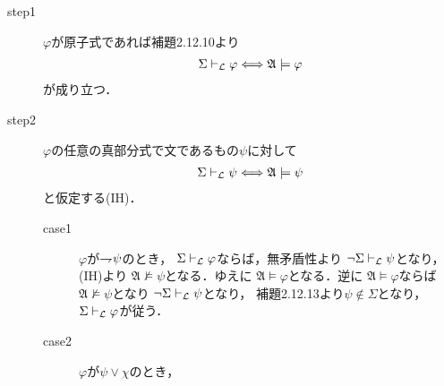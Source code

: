 	\begin{sketch}\mbox{}
		\begin{description}
			\item[step1]
				$\varphi$が原子式であれば補題2.12.10より
				\begin{align}
					\Sigma \vdash_{{\scriptsize \mathcal{L}}} \varphi \Longleftrightarrow 
					\mathfrak{A} \models \varphi
				\end{align}
				が成り立つ．
				
			\item[step2] $\varphi$の任意の真部分式で文であるもの$\psi$に対して
				\begin{align}
					\Sigma \vdash_{{\scriptsize \mathcal{L}}} \psi \Longleftrightarrow 
					\mathfrak{A} \models \psi
				\end{align}
				と仮定する(IH)．
				\begin{description}
					\item[case1] $\varphi$が$\rightharpoondown\hspace{-0.25em} \psi$のとき，
						$\Sigma \vdash_{{\scriptsize \mathcal{L}}} \varphi$ならば，無矛盾性より
						$\neg \Sigma \vdash_{{\scriptsize \mathcal{L}}} \psi$となり，(IH)より
						$\mathfrak{A} \not\models \psi$となる．ゆえに
						$\mathfrak{A} \models \varphi$となる．逆に
						$\mathfrak{A} \models \varphi$ならば$\mathfrak{A} \not\models \psi$となり
						$\neg \Sigma \vdash_{{\scriptsize \mathcal{L}}} \psi$となり，
						補題2.12.13より$\psi \notin \Sigma$となり，
						$\Sigma \vdash_{{\scriptsize \mathcal{L}}} \varphi$が従う．
						
					\item[case2] $\varphi$が$\psi \vee \chi$のとき，
				\end{description}
		\end{description}
	\end{sketch}